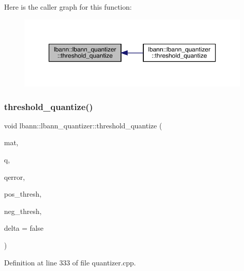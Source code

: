 Here is the caller graph for this function\+:\nopagebreak
\begin{figure}[H]
\begin{center}
\leavevmode
\includegraphics[width=350pt]{classlbann_1_1lbann__quantizer_a00106e69ea8a6dfe9e9a91c75b845bcd_icgraph}
\end{center}
\end{figure}
\mbox{\label{classlbann_1_1lbann__quantizer_ae9949af6bec1e95adf5a32ba9bb4afd8}} 
\subsubsection{\texorpdfstring{threshold\+\_\+quantize()}{threshold\_quantize()}\hspace{0.1cm}{\footnotesize\ttfamily [2/2]}}
{\footnotesize\ttfamily void lbann\+::lbann\+\_\+quantizer\+::threshold\+\_\+quantize (\begin{DoxyParamCaption}\item[{const \hyperlink{base_8hpp_a0fab5387556805cfeac3e7e567bf66c5}{Dist\+Mat} \&}]{mat,  }\item[{\hyperlink{classlbann_1_1lbann__quantizer_a85ea8e298c2975b4f802855278406aa7}{Thresh\+Quantized} \&}]{q,  }\item[{\hyperlink{base_8hpp_a68f11fdc31b62516cb310831bbe54d73}{Mat} \&}]{qerror,  }\item[{Data\+Type}]{pos\+\_\+thresh,  }\item[{Data\+Type}]{neg\+\_\+thresh,  }\item[{bool}]{delta = {\ttfamily false} }\end{DoxyParamCaption})}



Definition at line 333 of file quantizer.\+cpp.



